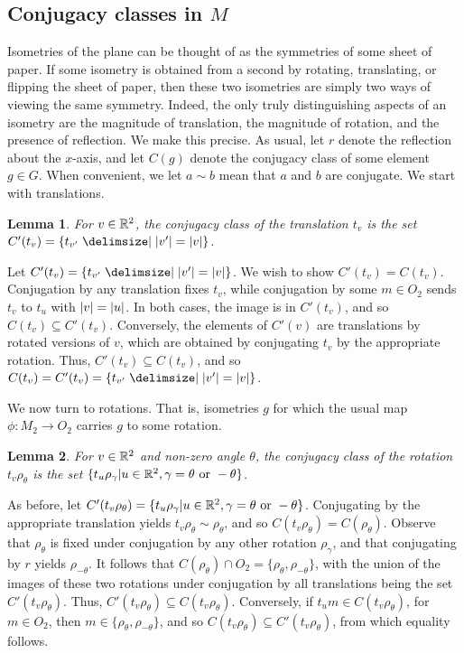 \documentclass{scrartcl}
\newcommand{\cbold}[1]{{#1}}
\newtheorem{lemma}{Lemma}
\begin{document}
\newpage
\subsection{Conjugacy classes in $M$}

\begin{solution}
    Isometries of the plane can be thought of as the symmetries of some sheet of paper. If some isometry is obtained from a second by rotating, translating, or flipping the sheet of paper, then these two isometries are simply two ways of viewing the same symmetry. Indeed, the only truly distinguishing aspects of an isometry are the \cbold{magnitude of translation}, the \cbold{magnitude of rotation}, and the \cbold{presence of reflection}. We make this precise. As usual, let $r$ denote the reflection about the $x$-axis, and let $C(g)$ denote the conjugacy class of some element $g\in G$. When convenient, we let $a\sim b$ mean that $a$ and $b$ are conjugate. We start with \cbold{translations}.
    \begin{lemma}
    For $v\in \mathbb R^2$, the conjugacy class of the translation $t_v$ is the set $C'(t_v)=\{t_{v'}\mid \abs{v'}=\abs{v}\}$.
    \end{lemma}
    \begin{tproof}
    Let $C'(t_v)=\{t_{v'}\mid \abs{v'}=\abs{v}\}$. We wish to show $C'(t_v)=C(t_v)$. Conjugation by any translation fixes $t_v$, while conjugation by some $m\in O_2$ sends $t_v$ to $t_u$ with $\lvert v\rvert=\lvert u\rvert$. In both cases, the image is in $C'(t_v)$, and so $C(t_v)\subseteq C'(t_v)$. Conversely, the elements of $C'(v)$ are translations by rotated versions of $v$, which are obtained by conjugating $t_v$ by the appropriate rotation. Thus, $C'(t_v)\subseteq C(t_v)$, and so $C(t_v)=C'(t_v)=\{t_{v'}\mid \abs{v'}=\abs{v}\}$.
    \end{tproof}

    We now turn to \cbold{rotations}. That is, isometries $g$ for which the usual map $\phi: M_2 \to O_2$ carries $g$ to some rotation.
    \begin{lemma}
    For $v\in \mathbb R^2$ and non-zero angle $\theta$, the conjugacy class of the rotation $t_v\rho_\theta$ is the set $\{t_u\rho_\gamma| u\in \mathbb R^2, \gamma=\theta \text{ or } -\theta\}$.
    \end{lemma}
    \begin{tproof} As before, let $C'(t_v\rho_\theta)=\{t_u\rho_\gamma| u\in \mathbb R^2, \gamma=\theta \text{ or } -\theta\}$. Conjugating by the appropriate translation yields $t_v\rho_\theta\sim \rho_\theta$, and so $C(t_v\rho_\theta)=C(\rho_\theta)$. Observe that $\rho_\theta$ is fixed under conjugation by any other rotation $\rho_\gamma$, and that conjugating by $r$ yields $\rho_{-\theta}$. It follows that $C(\rho_\theta)\cap O_2=\{\rho_{\theta},\rho_{-\theta}\}$, with the union of the images of these two rotations under conjugation by all translations being the set $C'(t_v\rho_\theta)$. Thus, $C'(t_v\rho_\theta)\subseteq C(t_v\rho_\theta)$. Conversely, if $t_um\in C(t_v\rho_\theta)$, for $m\in O_2$, then $m\in \{\rho_{\theta},\rho_{-\theta}\}$, and so $C(t_v\rho_\theta)\subseteq C'(t_v\rho_\theta)$, from which equality follows.
    \end{tproof}


\end{solution}
\end{document}
